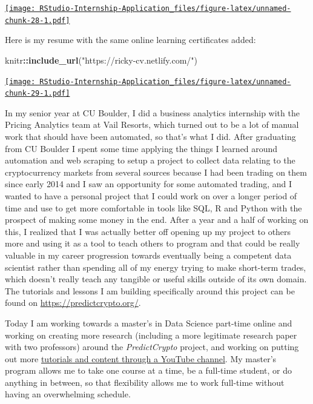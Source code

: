 \documentclass[
]{book}
\newenvironment{Shaded}{\begin{snugshade}}{\end{snugshade}}
\newcommand{\KeywordTok}[1]{\textcolor[rgb]{0.13,0.29,0.53}{\textbf{#1}}}
\newcommand{\NormalTok}[1]{#1}
\newcommand{\OperatorTok}[1]{\textcolor[rgb]{0.81,0.36,0.00}{\textbf{#1}}}
\newcommand{\StringTok}[1]{\textcolor[rgb]{0.31,0.60,0.02}{#1}}
\begin{document}
\href{https://resclapon.com/datacamp-certificates}{\texttt{[image: RStudio-Internship-Application\_files/figure-latex/unnamed-chunk-28-1.pdf]}}

Here is my resume with the same online learning certificates added:

\begin{Shaded}
\begin{Highlighting}[]
\NormalTok{knitr}\OperatorTok{::}\KeywordTok{include_url}\NormalTok{(}\StringTok{"https://ricky-cv.netlify.com/"}\NormalTok{)}
\end{Highlighting}
\end{Shaded}

\href{https://ricky-cv.netlify.com/}{\texttt{[image: RStudio-Internship-Application\_files/figure-latex/unnamed-chunk-29-1.pdf]}}

In my senior year at CU Boulder, I did a business analytics internship with the Pricing Analytics team at Vail Resorts, which turned out to be a lot of manual work that should have been automated, so that's what I did. After graduating from CU Boulder I spent some time applying the things I learned around automation and web scraping to setup a project to collect data relating to the cryptocurrency markets from several sources because I had been trading on them since early 2014 and I saw an opportunity for some automated trading, and I wanted to have a personal project that I could work on over a longer period of time and use to get more comfortable in tools like SQL, R and Python with the prospect of making some money in the end. After a year and a half of working on this, I realized that I was actually better off opening up my project to others more and using it as a tool to teach others to program and that could be really valuable in my career progression towards eventually being a competent data scientist rather than spending all of my energy trying to make short-term trades, which doesn't really teach any tangible or useful skills outside of its own domain. The tutorials and lessons I am building specifically around this project can be found on \url{https://predictcrypto.org/}.

Today I am working towards a master's in Data Science part-time online and working on creating more research (including a more legitimate research paper with two professors) around the \emph{PredictCrypto} project, and working on putting out more \href{https://www.youtube.com/channel/UCZKbm8LERZBe_hwJNwroCPg?view_as=subscriber}{tutorials and content through a YouTube channel}. My master's program allows me to take one course at a time, be a full-time student, or do anything in between, so that flexibility allows me to work full-time without having an overwhelming schedule.
\end{document}
